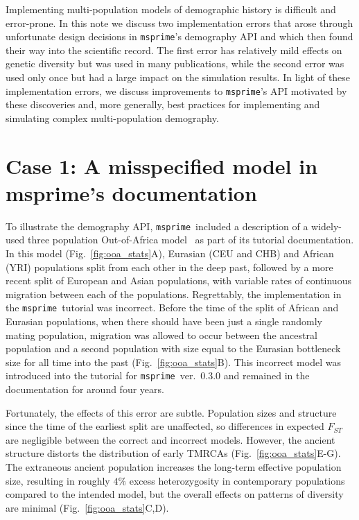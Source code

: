 \documentclass{article}
\newcommand{\msprime}[0]{\texttt{msprime}}
\begin{document}
Implementing multi-population models of demographic history is difficult and error-prone.
In this note we discuss two implementation errors that arose through
unfortunate design decisions in \msprime's demography API and which then found their way
into the scientific record. The first error has relatively mild effects on genetic diversity but was
used in many publications, while the second error was used only once but had a large impact on the
simulation results.
In light of these implementation errors, we discuss improvements to \msprime's API motivated by these
discoveries and, more generally, best practices for implementing and simulating complex multi-population
demography.

\section*{Case 1: A misspecified model in msprime's documentation}

To illustrate the demography API, \msprime\ included a description of a widely-used
three population Out-of-Africa model~\citep{gutenkunst2009inferring}
as part of its tutorial documentation. In this model (Fig.~\ref{fig:ooa_stats}A),
Eurasian (CEU and CHB) and African (YRI) populations split from each other in the deep past,
followed by a more recent split of European and Asian populations, with variable rates of
continuous migration between each of the populations. Regrettably, the implementation in the
\msprime\ tutorial was incorrect. Before the time of the split of African and Eurasian
populations, when there should have been just a single randomly mating population, migration was
allowed to occur between the ancestral population and a second population with size equal to
the Eurasian bottleneck size for all time into the past
(Fig.~\ref{fig:ooa_stats}B). This incorrect model was introduced into
the tutorial for \msprime~ver.~0.3.0 and remained in the documentation for
around four years.

Fortunately, the effects of this error are subtle.
Population sizes and structure since the time of
the earliest split are unaffected, so differences in expected $F_{ST}$ are negligible between
the correct and incorrect models. However, the ancient structure distorts the distribution
of early TMRCAs (Fig.~\ref{fig:ooa_stats}E-G).
The extraneous ancient population increases the long-term effective
population size, resulting in roughly $4\%$ excess heterozygosity in
contemporary populations compared to the intended model, but the overall effects
on patterns of diversity are minimal (Fig.~\ref{fig:ooa_stats}C,D).
\end{document}
